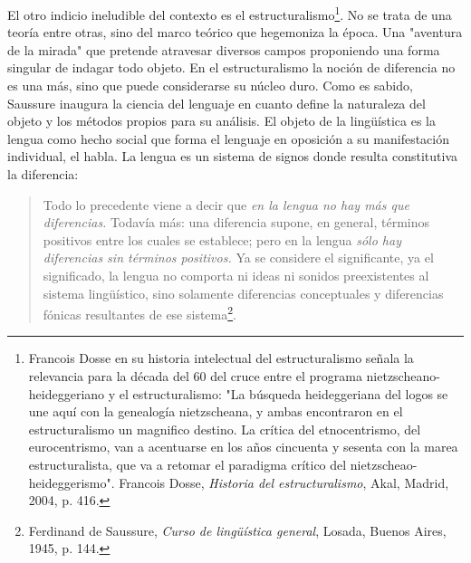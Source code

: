 \documentclass{book}
\begin{document}
El otro indicio ineludible del contexto es el
estructuralismo\footnote{Francois Dosse en su historia intelectual del
  estructuralismo señala la relevancia para la década del 60 del cruce
  entre el programa nietzscheano-heideggeriano y el estructuralismo: "La
  búsqueda heideggeriana del logos se une aquí con la genealogía
  nietzscheana, y ambas encontraron en el estructuralismo un magnifico
  destino. La crítica del etnocentrismo, del eurocentrismo, van a
  acentuarse en los años cincuenta y sesenta con la marea
  estructuralista, que va a retomar el paradigma crítico del
  nietzscheao-heideggerismo". Francois Dosse, \emph{Historia del
  estructuralismo}, Akal, Madrid, 2004, p. 416.}. No se trata de una
teoría entre otras, sino del marco teórico que hegemoniza la época. Una
"aventura de la mirada" que pretende atravesar diversos campos
proponiendo una forma singular de indagar todo objeto. En el
estructuralismo la noción de diferencia no es una más, sino que puede
considerarse su núcleo duro. Como es sabido, Saussure inaugura la
ciencia del lenguaje en cuanto define la naturaleza del objeto y los
métodos propios para su análisis. El objeto de la lingüística es la
lengua como hecho social que forma el lenguaje en oposición a su
manifestación individual, el habla. La lengua es un sistema de signos
donde resulta constitutiva la diferencia:

\begin{quote}
Todo lo precedente viene a decir que \emph{en la lengua no hay más que
diferencias.} Todavía más: una diferencia supone, en general, términos
positivos entre los cuales se establece; pero en la lengua \emph{sólo
hay diferencias sin términos positivos.} Ya se considere el
significante, ya el significado, la lengua no comporta ni ideas ni
sonidos preexistentes al sistema lingüístico, sino solamente diferencias
conceptuales y diferencias fónicas resultantes de ese
sistema\footnote{Ferdinand de Saussure, \emph{Curso de lingüística
  general}, Losada, Buenos Aires, 1945, p. 144.}.
\end{quote}
\end{document}
